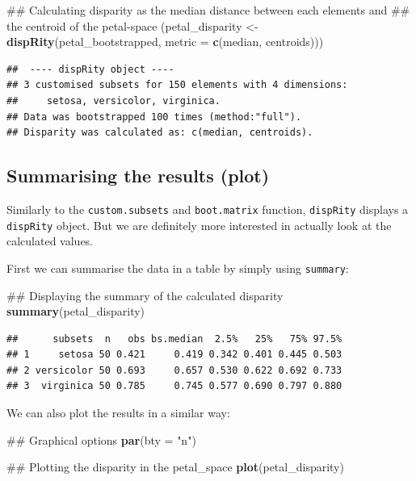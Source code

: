 \documentclass[]{book}
\newenvironment{Shaded}{\begin{snugshade}}{\end{snugshade}}
\newcommand{\KeywordTok}[1]{\textcolor[rgb]{0.13,0.29,0.53}{\textbf{#1}}}
\newcommand{\DataTypeTok}[1]{\textcolor[rgb]{0.13,0.29,0.53}{#1}}
\newcommand{\StringTok}[1]{\textcolor[rgb]{0.31,0.60,0.02}{#1}}
\newcommand{\NormalTok}[1]{#1}
\theoremstyle{definition}
\theoremstyle{definition}
\theoremstyle{remark}
\begin{document}
\begin{Shaded}
\begin{Highlighting}[]
\NormalTok{## Calculating disparity as the median distance between each elements and}
\NormalTok{## the centroid of the petal-space}
\NormalTok{(petal_disparity <-}\StringTok{ }\KeywordTok{dispRity}\NormalTok{(petal_bootstrapped, }\DataTypeTok{metric =} \KeywordTok{c}\NormalTok{(median, centroids)))}
\end{Highlighting}
\end{Shaded}

\begin{verbatim}
##  ---- dispRity object ---- 
## 3 customised subsets for 150 elements with 4 dimensions:
##     setosa, versicolor, virginica.
## Data was bootstrapped 100 times (method:"full").
## Disparity was calculated as: c(median, centroids).
\end{verbatim}

\subsection{Summarising the results
(plot)}\label{summarising-the-results-plot}

Similarly to the \texttt{custom.subsets} and \texttt{boot.matrix}
function, \texttt{dispRity} displays a \texttt{dispRity} object. But we
are definitely more interested in actually look at the calculated
values.

First we can summarise the data in a table by simply using
\texttt{summary}:

\begin{Shaded}
\begin{Highlighting}[]
\NormalTok{## Displaying the summary of the calculated disparity}
\KeywordTok{summary}\NormalTok{(petal_disparity)}
\end{Highlighting}
\end{Shaded}

\begin{verbatim}
##      subsets  n   obs bs.median  2.5%   25%   75% 97.5%
## 1     setosa 50 0.421     0.419 0.342 0.401 0.445 0.503
## 2 versicolor 50 0.693     0.657 0.530 0.622 0.692 0.733
## 3  virginica 50 0.785     0.745 0.577 0.690 0.797 0.880
\end{verbatim}

We can also plot the results in a similar way:

\begin{Shaded}
\begin{Highlighting}[]
\NormalTok{## Graphical options}
\KeywordTok{par}\NormalTok{(}\DataTypeTok{bty =} \StringTok{"n"}\NormalTok{)}

\NormalTok{## Plotting the disparity in the petal_space}
\KeywordTok{plot}\NormalTok{(petal_disparity)}
\end{Highlighting}
\end{Shaded}
\end{document}
